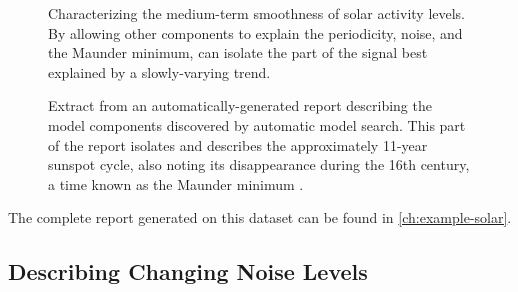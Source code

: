 \begin{figure}[ht!]
\centering
{}
\caption[\procedurename{} isolating the part of the signal explained by a slowly-varying trend]
{Characterizing the medium-term smoothness of solar activity levels.
By allowing other components to explain the periodicity, noise, and the Maunder minimum, \procedurename{} can isolate the part of the signal best explained by a slowly-varying trend.}
\label{fig:smooth}
\end{figure}


\begin{figure}[ht!]
\centering
{}
\caption[Extract from an automatically-generated report]
{Extract from an automatically-generated report describing the model components discovered by automatic model search.
This part of the report isolates and describes the approximately 11-year sunspot cycle, also noting its disappearance during the 16th century, a time known as the Maunder minimum \citep{lean1995reconstruction}.}
\label{fig:periodic}
\end{figure}

The complete report generated on this dataset can be found in \cref{ch:example-solar}.



\subsection{Describing Changing Noise Levels} %
\label{sec:airline}


